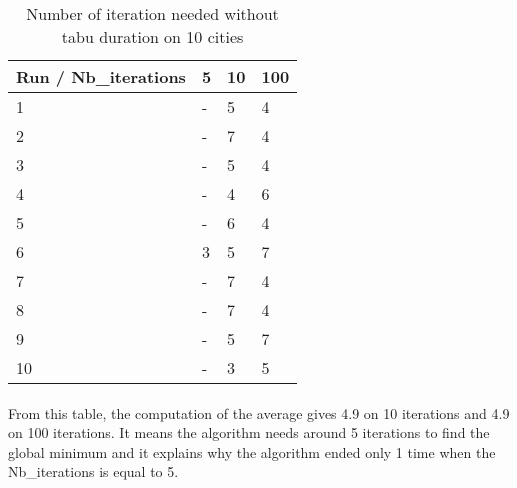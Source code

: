 \documentclass[12pt,oneside,a4paper]{article}
\begin{document}
\begin{table}[h]
    \centering
    \small
    \begin{tabular}{llll}
      \hline
      \multicolumn{1}{|l|}{\textbf{Run / Nb\_iterations}}& \multicolumn{1}{l|}{\textbf{5}} & \multicolumn{1}{l|}{\textbf{10}} & \multicolumn{1}{l|}{\textbf{100}}\\ \hline
      \multicolumn{1}{|l|}{1} & \multicolumn{1}{l|}{-}  & \multicolumn{1}{l|}{5}  & \multicolumn{1}{l|}{4}  \\ \hline
      \multicolumn{1}{|l|}{2} & \multicolumn{1}{l|}{-}  & \multicolumn{1}{l|}{7}  & \multicolumn{1}{l|}{4}  \\ \hline         
      \multicolumn{1}{|l|}{3} & \multicolumn{1}{l|}{-}  & \multicolumn{1}{l|}{5}  & \multicolumn{1}{l|}{4}  \\ \hline
      \multicolumn{1}{|l|}{4} & \multicolumn{1}{l|}{-}  & \multicolumn{1}{l|}{4}  & \multicolumn{1}{l|}{6}  \\ \hline
      \multicolumn{1}{|l|}{5} & \multicolumn{1}{l|}{-}  & \multicolumn{1}{l|}{6}  & \multicolumn{1}{l|}{4}  \\ \hline
      \multicolumn{1}{|l|}{6} & \multicolumn{1}{l|}{3}  & \multicolumn{1}{l|}{5}  & \multicolumn{1}{l|}{7}  \\ \hline
      \multicolumn{1}{|l|}{7} & \multicolumn{1}{l|}{-}  & \multicolumn{1}{l|}{7}  & \multicolumn{1}{l|}{4}  \\ \hline
      \multicolumn{1}{|l|}{8} & \multicolumn{1}{l|}{-}  & \multicolumn{1}{l|}{7}  & \multicolumn{1}{l|}{4}  \\ \hline
      \multicolumn{1}{|l|}{9} & \multicolumn{1}{l|}{-}  & \multicolumn{1}{l|}{5}  & \multicolumn{1}{l|}{7}  \\ \hline
      \multicolumn{1}{|l|}{10} & \multicolumn{1}{l|}{-}  & \multicolumn{1}{l|}{3}  & \multicolumn{1}{l|}{5}  \\ \hline
    \end{tabular}
    \caption{Number of iteration needed without tabu duration on 10 cities}
    \label{Performances scénario 0}
  \end{table}

\paragraph{}
    From this table, the computation of the average gives 4.9 on 10 iterations and 4.9 on 100 iterations.
    It means the algorithm needs around 5 iterations to find the global minimum and it explains why the algorithm
    ended only 1 time when the Nb\_iterations is equal to 5.
\end{document}

